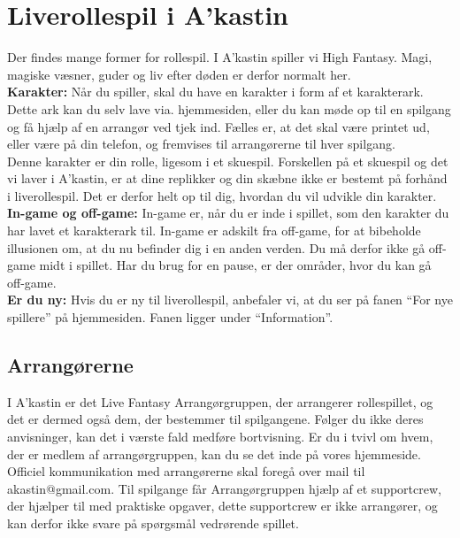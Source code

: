 \chapter*{Liverollespil i A’kastin}
Der findes mange former for rollespil. I A’kastin spiller vi High Fantasy. Magi, magiske væsner, guder og liv efter døden er derfor normalt her.\\
\textbf{Karakter:} Når du spiller, skal du have en karakter i form af et karakterark. Dette ark kan du selv lave via. hjemmesiden, eller du kan møde op til en spilgang og få hjælp af en arrangør ved tjek ind. Fælles er, at det skal være printet ud, eller være på din telefon, og fremvises til arrangørerne til hver spilgang.\\
Denne karakter er din rolle, ligesom i et skuespil. Forskellen på et skuespil og det vi laver i A’kastin, er at dine replikker og din skæbne ikke er bestemt på forhånd i liverollespil. Det er derfor helt op til dig, hvordan du vil udvikle din karakter.\\
\textbf{In-game og off-game:} In-game er, når du er inde i spillet, som den karakter du har lavet et karakterark til. In-game er adskilt fra off-game, for at bibeholde illusionen om, at du nu befinder dig i en anden verden. Du må derfor ikke gå off-game midt i spillet. Har du brug for en pause, er der områder, hvor du kan gå off-game.\\
\textbf{Er du ny:} Hvis du er ny til liverollespil, anbefaler vi, at du ser på fanen “For nye spillere” på hjemmesiden. Fanen ligger under “Information”.

\section*{Arrangørerne}

I A’kastin er det Live Fantasy Arrangørgruppen, der arrangerer rollespillet, og det er dermed også dem, der bestemmer til spilgangene.
Følger du ikke deres anvisninger, kan det i værste fald medføre bortvisning.
Er du i tvivl om hvem, der er medlem af arrangørgruppen, kan du se det inde på vores hjemmeside.
Officiel kommunikation med arrangørerne skal foregå over mail til akastin@gmail.com.
Til spilgange får Arrangørgruppen hjælp af et supportcrew, der hjælper til med praktiske opgaver, dette supportcrew er ikke arrangører, og kan derfor ikke svare på spørgsmål vedrørende spillet.

